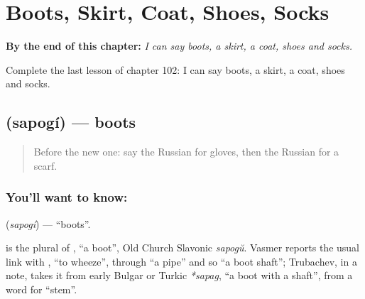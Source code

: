 
\chapter{Boots, Skirt, Coat, Shoes, Socks}
\label{ch:ru-boots-skirt-coat-shoes-socks}

\begin{chapteropening}
\textbf{By the end of this chapter:} \emph{I can say boots, a skirt, a coat, shoes and socks.}

Complete the last lesson of chapter 102: I can say boots, a skirt, a coat, shoes and socks.
\end{chapteropening}

\section[\texorpdfstring{\ru{сапоги} (sapogí)}{сапоги (sapogí)}]{ (sapogí) — boots}

\label{lesson:RU-C102-boots}



\begin{quote}
Before the new one: say the Russian for gloves, then the Russian for a scarf.
\end{quote}

\subsection*{You'll want to know: }
\textbf{} (\emph{sapogí}) — \textquotedblleft{}boots\textquotedblright{}.

\begin{cousinweb}
\textbf{} is the plural of \emph{}, \textquotedblleft{}a boot\textquotedblright{}, Old Church Slavonic \emph{sapogŭ}. Vasmer reports the usual link with \emph{}, \textquotedblleft{}to wheeze\textquotedblright{}, through \textquotedblleft{}a pipe\textquotedblright{} and so \textquotedblleft{}a boot shaft\textquotedblright{}; Trubachev, in a note, takes it from early Bulgar or Turkic \emph{*sapag}, \textquotedblleft{}a boot with a shaft\textquotedblright{}, from a word for \textquotedblleft{}stem\textquotedblright{}.
\end{cousinweb}

